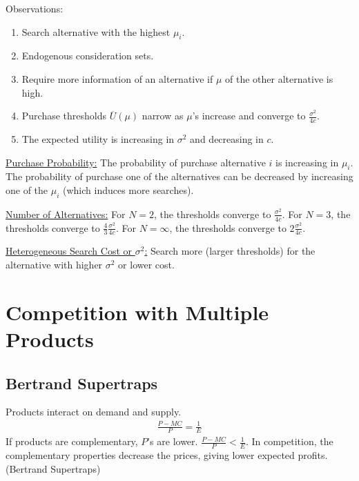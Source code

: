 \documentclass[11pt]{elegantbook}
\begin{document}
Observations:
\begin{enumerate}
    \item Search alternative with the highest $\mu_i$.
    \item Endogenous consideration sets.
    \item Require more information of an alternative if $\mu$ of the other alternative is high.
    \item Purchase thresholds $\overline{U}(\mu)$ narrow as $\mu$'s increase and converge to $\frac{\sigma^2}{4c}$.
    \item The expected utility is increasing in $\sigma^2$ and decreasing in $c$.
\end{enumerate}
\underline{Purchase Probability:} The probability of purchase alternative $i$ is increasing in $\mu_i$. The probability of purchase one of the alternatives can be decreased by increasing one of the $\mu_i$ (which induces more searches).

\underline{Number of Alternatives:} For $N=2$, the thresholds converge to $\frac{\sigma^2}{4c}$. For $N=3$, the thresholds converge to $\frac{4}{3}\frac{\sigma^2}{4c}$. For $N=\infty$, the thresholds converge to $2\frac{\sigma^2}{4c}$.

\underline{Heterogeneous Search Cost or $\sigma^2$:} Search more (larger thresholds) for the alternative with higher $\sigma^2$ or lower cost.




























\section{Competition with Multiple Products}
\subsection{Bertrand Supertraps}
Products interact on demand and supply.
\begin{equation}
    \begin{aligned}
        \frac{P-MC}{P}=\frac{1}{E}
    \end{aligned}
    \nonumber
\end{equation}
If products are complementary, $P$'s are lower. $\frac{P-MC}{P}<\frac{1}{E}$. In competition, the complementary properties decrease the prices, giving lower expected profits. (Bertrand Supertraps)
\end{document}
